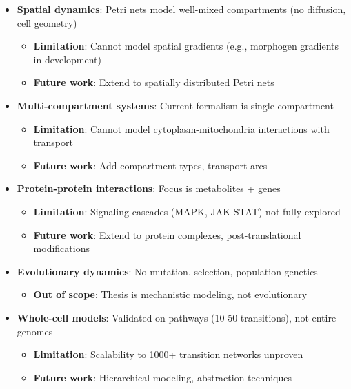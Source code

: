 \begin{itemize}
    \item \textbf{Spatial dynamics}: Petri nets model well-mixed compartments (no diffusion, cell geometry)
    \begin{itemize}
        \item \textbf{Limitation}: Cannot model spatial gradients (e.g., morphogen gradients in development)
        \item \textbf{Future work}: Extend to spatially distributed Petri nets
    \end{itemize}
    
    \item \textbf{Multi-compartment systems}: Current formalism is single-compartment
    \begin{itemize}
        \item \textbf{Limitation}: Cannot model cytoplasm-mitochondria interactions with transport
        \item \textbf{Future work}: Add compartment types, transport arcs
    \end{itemize}
    
    \item \textbf{Protein-protein interactions}: Focus is metabolites + genes
    \begin{itemize}
        \item \textbf{Limitation}: Signaling cascades (MAPK, JAK-STAT) not fully explored
        \item \textbf{Future work}: Extend to protein complexes, post-translational modifications
    \end{itemize}
    
    \item \textbf{Evolutionary dynamics}: No mutation, selection, population genetics
    \begin{itemize}
        \item \textbf{Out of scope}: Thesis is mechanistic modeling, not evolutionary
    \end{itemize}
    
    \item \textbf{Whole-cell models}: Validated on pathways (10-50 transitions), not entire genomes
    \begin{itemize}
        \item \textbf{Limitation}: Scalability to 1000+ transition networks unproven
        \item \textbf{Future work}: Hierarchical modeling, abstraction techniques
    \end{itemize}
\end{itemize}

